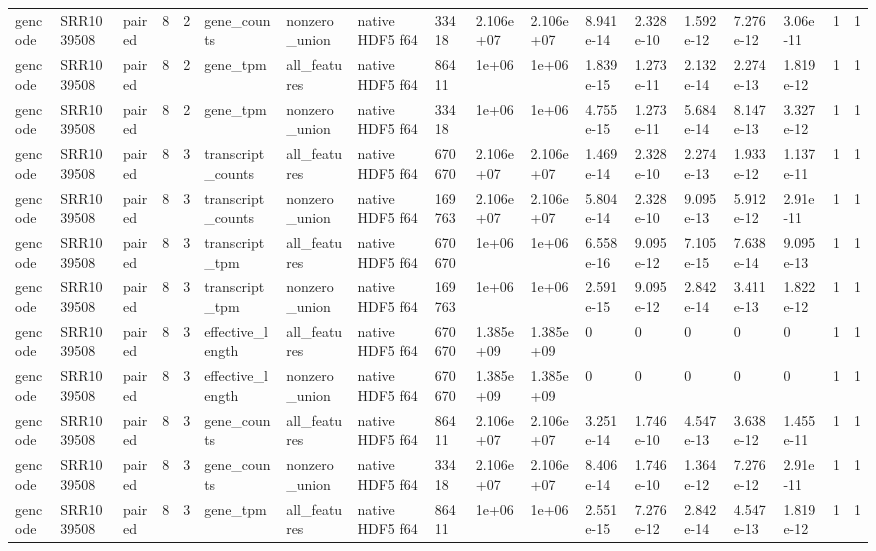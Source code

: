 \begin{tabular}{llllllllllllllllll}
gencode & SRR1039508 & paired & 8 & 2 & gene\_counts & nonzero\_union & native HDF5 f64 & 33418 & 2.106e+07 & 2.106e+07 & 8.941e-14 & 2.328e-10 & 1.592e-12 & 7.276e-12 & 3.06e-11 & 1 & 1 \\
gencode & SRR1039508 & paired & 8 & 2 & gene\_tpm & all\_features & native HDF5 f64 & 86411 & 1e+06 & 1e+06 & 1.839e-15 & 1.273e-11 & 2.132e-14 & 2.274e-13 & 1.819e-12 & 1 & 1 \\
gencode & SRR1039508 & paired & 8 & 2 & gene\_tpm & nonzero\_union & native HDF5 f64 & 33418 & 1e+06 & 1e+06 & 4.755e-15 & 1.273e-11 & 5.684e-14 & 8.147e-13 & 3.327e-12 & 1 & 1 \\
gencode & SRR1039508 & paired & 8 & 3 & transcript\_counts & all\_features & native HDF5 f64 & 670670 & 2.106e+07 & 2.106e+07 & 1.469e-14 & 2.328e-10 & 2.274e-13 & 1.933e-12 & 1.137e-11 & 1 & 1 \\
gencode & SRR1039508 & paired & 8 & 3 & transcript\_counts & nonzero\_union & native HDF5 f64 & 169763 & 2.106e+07 & 2.106e+07 & 5.804e-14 & 2.328e-10 & 9.095e-13 & 5.912e-12 & 2.91e-11 & 1 & 1 \\
gencode & SRR1039508 & paired & 8 & 3 & transcript\_tpm & all\_features & native HDF5 f64 & 670670 & 1e+06 & 1e+06 & 6.558e-16 & 9.095e-12 & 7.105e-15 & 7.638e-14 & 9.095e-13 & 1 & 1 \\
gencode & SRR1039508 & paired & 8 & 3 & transcript\_tpm & nonzero\_union & native HDF5 f64 & 169763 & 1e+06 & 1e+06 & 2.591e-15 & 9.095e-12 & 2.842e-14 & 3.411e-13 & 1.822e-12 & 1 & 1 \\
gencode & SRR1039508 & paired & 8 & 3 & effective\_length & all\_features & native HDF5 f64 & 670670 & 1.385e+09 & 1.385e+09 & 0 & 0 & 0 & 0 & 0 & 1 & 1 \\
gencode & SRR1039508 & paired & 8 & 3 & effective\_length & nonzero\_union & native HDF5 f64 & 670670 & 1.385e+09 & 1.385e+09 & 0 & 0 & 0 & 0 & 0 & 1 & 1 \\
gencode & SRR1039508 & paired & 8 & 3 & gene\_counts & all\_features & native HDF5 f64 & 86411 & 2.106e+07 & 2.106e+07 & 3.251e-14 & 1.746e-10 & 4.547e-13 & 3.638e-12 & 1.455e-11 & 1 & 1 \\
gencode & SRR1039508 & paired & 8 & 3 & gene\_counts & nonzero\_union & native HDF5 f64 & 33418 & 2.106e+07 & 2.106e+07 & 8.406e-14 & 1.746e-10 & 1.364e-12 & 7.276e-12 & 2.91e-11 & 1 & 1 \\
gencode & SRR1039508 & paired & 8 & 3 & gene\_tpm & all\_features & native HDF5 f64 & 86411 & 1e+06 & 1e+06 & 2.551e-15 & 7.276e-12 & 2.842e-14 & 4.547e-13 & 1.819e-12 & 1 & 1 \\

\end{tabular}
